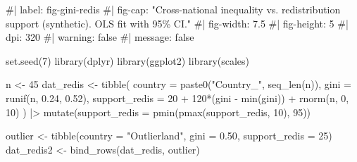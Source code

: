 \documentclass[
  letterpaper,
  DIV=11,
  numbers=noendperiod]{scrreprt}
\newenvironment{Shaded}{\begin{snugshade}}{\end{snugshade}}
\newcommand{\AttributeTok}[1]{\textcolor[rgb]{0.40,0.45,0.13}{#1}}
\newcommand{\CommentTok}[1]{\textcolor[rgb]{0.37,0.37,0.37}{#1}}
\newcommand{\DecValTok}[1]{\textcolor[rgb]{0.68,0.00,0.00}{#1}}
\newcommand{\FloatTok}[1]{\textcolor[rgb]{0.68,0.00,0.00}{#1}}
\newcommand{\FunctionTok}[1]{\textcolor[rgb]{0.28,0.35,0.67}{#1}}
\newcommand{\NormalTok}[1]{\textcolor[rgb]{0.00,0.23,0.31}{#1}}
\newcommand{\OtherTok}[1]{\textcolor[rgb]{0.00,0.23,0.31}{#1}}
\newcommand{\SpecialCharTok}[1]{\textcolor[rgb]{0.37,0.37,0.37}{#1}}
\newcommand{\StringTok}[1]{\textcolor[rgb]{0.13,0.47,0.30}{#1}}
\begin{document}
\begin{Shaded}
\begin{Highlighting}[]
\CommentTok{\#| label: fig{-}gini{-}redis}
\CommentTok{\#| fig{-}cap: "Cross{-}national inequality vs. redistribution support (synthetic). OLS fit with 95\% CI."}
\CommentTok{\#| fig{-}width: 7.5}
\CommentTok{\#| fig{-}height: 5}
\CommentTok{\#| dpi: 320}
\CommentTok{\#| warning: false}
\CommentTok{\#| message: false}

\FunctionTok{set.seed}\NormalTok{(}\DecValTok{7}\NormalTok{)}
\FunctionTok{library}\NormalTok{(dplyr)}
\FunctionTok{library}\NormalTok{(ggplot2)}
\FunctionTok{library}\NormalTok{(scales)}

\NormalTok{n }\OtherTok{\textless{}{-}} \DecValTok{45}
\NormalTok{dat\_redis }\OtherTok{\textless{}{-}} \FunctionTok{tibble}\NormalTok{(}
  \AttributeTok{country =} \FunctionTok{paste0}\NormalTok{(}\StringTok{"Country\_"}\NormalTok{, }\FunctionTok{seq\_len}\NormalTok{(n)),}
  \AttributeTok{gini =} \FunctionTok{runif}\NormalTok{(n, }\FloatTok{0.24}\NormalTok{, }\FloatTok{0.52}\NormalTok{),}
  \AttributeTok{support\_redis =} \DecValTok{20} \SpecialCharTok{+} \DecValTok{120}\SpecialCharTok{*}\NormalTok{(gini }\SpecialCharTok{{-}} \FunctionTok{min}\NormalTok{(gini)) }\SpecialCharTok{+} \FunctionTok{rnorm}\NormalTok{(n, }\DecValTok{0}\NormalTok{, }\DecValTok{10}\NormalTok{)}
\NormalTok{) }\SpecialCharTok{|\textgreater{}}
  \FunctionTok{mutate}\NormalTok{(}\AttributeTok{support\_redis =} \FunctionTok{pmin}\NormalTok{(}\FunctionTok{pmax}\NormalTok{(support\_redis, }\DecValTok{10}\NormalTok{), }\DecValTok{95}\NormalTok{))}

\NormalTok{outlier }\OtherTok{\textless{}{-}} \FunctionTok{tibble}\NormalTok{(}\AttributeTok{country =} \StringTok{"Outlierland"}\NormalTok{, }\AttributeTok{gini =} \FloatTok{0.50}\NormalTok{, }\AttributeTok{support\_redis =} \DecValTok{25}\NormalTok{)}
\NormalTok{dat\_redis2 }\OtherTok{\textless{}{-}} \FunctionTok{bind\_rows}\NormalTok{(dat\_redis, outlier)}


\end{Highlighting}
\end{Shaded}
\end{document}
